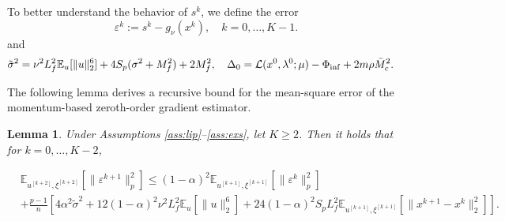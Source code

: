 \documentclass[11pt]{article}
\newtheorem{lemma}{Lemma}[section]
\numberwithin{equation}{section}
\newcommand{\E}{\mathbb{E}}
\newcommand{\be}{\begin{equation}}
\newcommand{\ee}{\end{equation}}
\newcommand{\bee}{\begin{equation*}}
\newcommand{\eee}{\end{equation*}}
\begin{document}
To better understand the behavior of $s^k$, we define the error 
\bee
\varepsilon^k := s^k - g_\nu (x^k), \quad k=0,\ldots,K-1.
\eee  
and
    \be \label{ab}
    \begin{aligned}
        \tilde \sigma^2 &= \nu^2 L_f^2 \E_u[\|u\|_2^6]+4 S_p (\sigma^2+M_f^2)+ 2M_f^2,\quad
          \Delta_0 = \mathcal{L}(x^0,\lambda^0;\mu)-\Phi_{\rm inf}+2m \rho \bar{M}_c^2.
    \end{aligned}
    \ee

  The following lemma derives a recursive bound for the mean-square error of the momentum-based zeroth-order gradient estimator.
\begin{lemma}\label{le:eps}
    Under Assumptions \ref{ass:lip}--\ref{ass:exs}, let \(K\ge2\). Then it holds that  for $k=0,\ldots,K-2$,\ %
   
    \be\label{ave-eps}
    \begin{aligned}
         &\E_{u^{[k+2]},\xi^{[k+2]}}[\|\varepsilon^{k+1}\|_p^2]
    \leq (1-\alpha)^2 \E_{u^{[k+1]},\xi^{[k+1]}}[\|\varepsilon^k\|_p^2]\\
    &+\frac{p-1}{n}[4\alpha^2 {\tilde \sigma^2} + 12 (1-\alpha)^2 \nu^2 L_f^2 \E_u[\|u\|_2^6] + 24(1-\alpha)^2S_pL_f^2
\E_{u^{[k+1]},\xi^{[k+1]}}
[\|x^{k+1}-x^k\|_2^2]].
    \end{aligned}
    \ee
\end{lemma}
\end{document}
